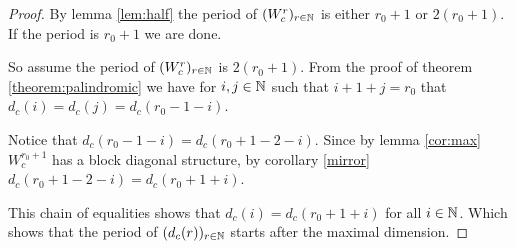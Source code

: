 \begin{proof}
  By lemma \ref{lem:half} the period of $(W_{c}^r)_{r\in\mathbb{N}}$ is either $r_{0}+1$ or $2(r_{0}+1)$. If the period is $r_{0}+1$ we are done.

  So assume the period of $(W_{c}^r)_{r\in\mathbb{N}}$ is $2(r_{0}+1)$. From the proof of theorem \ref{theorem:palindromic} we have for $i,j\in\mathbb{N}$ such
  that $i+1+j=r_{0}$ that $d_{c}(i) = d_{c}(j) = d_{c}(r_{0}-1-i)$.

  Notice that $d_{c}(r_{0}-1-i) = d_{c}(r_{0}+1-2-i)$. Since by lemma \ref{cor:max} $W_{c}^{r_{0}+1}$ has a block diagonal structure, by corollary 
  \ref{mirror} $d_{c}(r_{0}+1-2-i) = d_{c}(r_{0}+1+i)$.

  This chain of equalities shows that $d_{c}(i) = d_{c}(r_{0}+1+i)$ for all $i\in\mathbb{N}$. Which shows that the period of $(d_{c}(r))_{r\in\mathbb{N}}$
  starts after the maximal dimension.
\end{proof}
